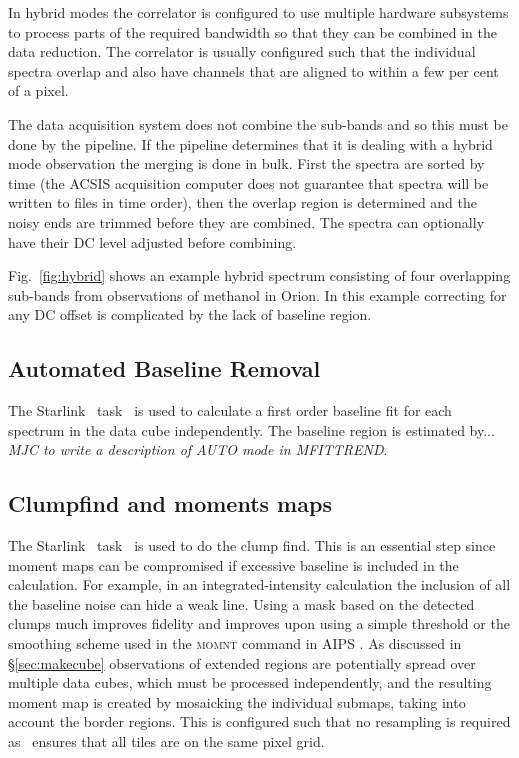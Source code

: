 \documentclass[final,authoryear,5p,times,twocolumn]{elsarticle}
\begin{document}
In hybrid modes the correlator is configured to use multiple
hardware subsystems to process parts of the required bandwidth so
that they can be combined in the data reduction. The correlator is
usually configured such that the individual spectra overlap and also
have channels that are aligned to within a few per cent of a pixel.

The data acquisition system does not combine the sub-bands and so this
must be done by the pipeline. If the pipeline determines that it is
dealing with a hybrid mode observation the merging is done in
bulk. First the spectra are sorted by time (the ACSIS acquisition
computer does not guarantee that spectra will be written to files in
time order), then the overlap region is determined and the noisy ends
are trimmed before they are combined. The spectra can optionally have
their DC level adjusted before combining.

Fig.\ \ref{fig:hybrid} shows an example hybrid spectrum consisting of
four overlapping sub-bands from observations of methanol in Orion. In this
example correcting for any DC offset is complicated by the lack of
baseline region.

\subsection{Automated Baseline Removal}
\label{sec:mfittrend}

The Starlink \KAPPA\ task \mfittrend\ is used to calculate a
first order baseline fit for each spectrum in the data cube
independently. The baseline region is estimated by...
\emph{\color{red} MJC to
  write a description of AUTO mode in MFITTREND}.


\subsection{Clumpfind and moments maps \label{sec:moment}}

The Starlink \cupid\ task \findclumps\ is used to do the clump
find. This is an essential step since moment maps can be compromised
if excessive baseline is included in the calculation. For example, in an
integrated-intensity calculation the inclusion of all the baseline noise can
hide a weak line.
Using a mask based on the detected clumps much improves
fidelity and improves upon using a simple threshold or
the smoothing scheme used in the \textsc{momnt} command in AIPS
\cite[][]{2003ASSL..285..109G}. As discussed in \S \ref{sec:makecube}
observations of extended regions are potentially spread over multiple
data cubes, which must be processed independently, and the resulting
moment map is created by
mosaicking the individual submaps, taking into account the border
regions. This is configured such that no resampling is required as
\makecube\ ensures that all tiles are on the same pixel grid.
\end{document}
